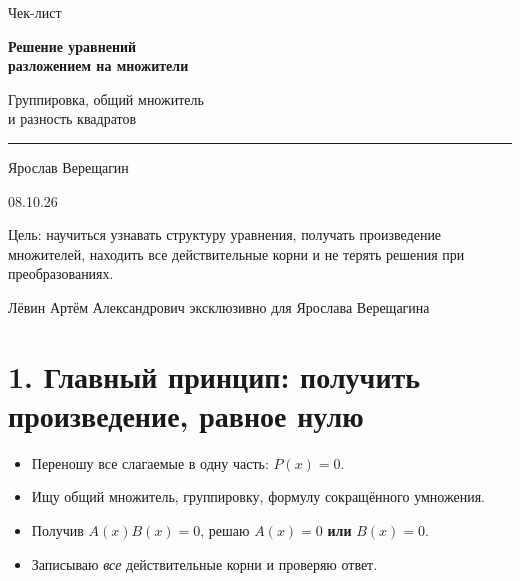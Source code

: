 \documentclass[a4paper,12pt]{article}
\newcommand{\sectionrule}{\par\vspace{-0.4em}\noindent{\color{rulegray}\rule{\linewidth}{0.6pt}}\par\vspace{0.25em}}
\begin{document}
\color{textgray}
\begin{titlepage}
\thispagestyle{empty}
\centering
\vspace*{30mm}
{\large\color{softgray}Чек-лист}\par
\vspace{6mm}
{\Huge\bfseries\color{darkaccent}Решение уравнений\\[2mm]разложением на множители}\par
\vspace{5mm}
{\Large\color{accent}Группировка, общий множитель\\и разность квадратов}\par
\vspace{15mm}
\rule{0.68\linewidth}{0.7pt}\par
\vspace{9mm}
{\large Ярослав Верещагин}\par
\vspace{2mm}
{\normalsize 08.10.26}\par
\vfill
\begin{minipage}{0.83\linewidth}\centering\small
Цель: научиться узнавать структуру уравнения, получать произведение множителей,
находить все действительные корни и не терять решения при преобразованиях.
\end{minipage}
\vfill
{\small\color{softgray}Лёвин Артём Александрович эксклюзивно для Ярослава Верещагина}\par
\vspace{11mm}
\end{titlepage}

\section*{1. Главный принцип: получить произведение, равное нулю}
\sectionrule
\begin{itemize}
  \item[$\square$] Переношу все слагаемые в одну часть: \(P(x)=0\).
  \item[$\square$] Ищу общий множитель, группировку, формулу сокращённого умножения.
  \item[$\square$] Получив \(A(x)B(x)=0\), решаю \(A(x)=0\) \textbf{или} \(B(x)=0\).
  \item[$\square$] Записываю \emph{все} действительные корни и проверяю ответ.
\end{itemize}
\end{document}
